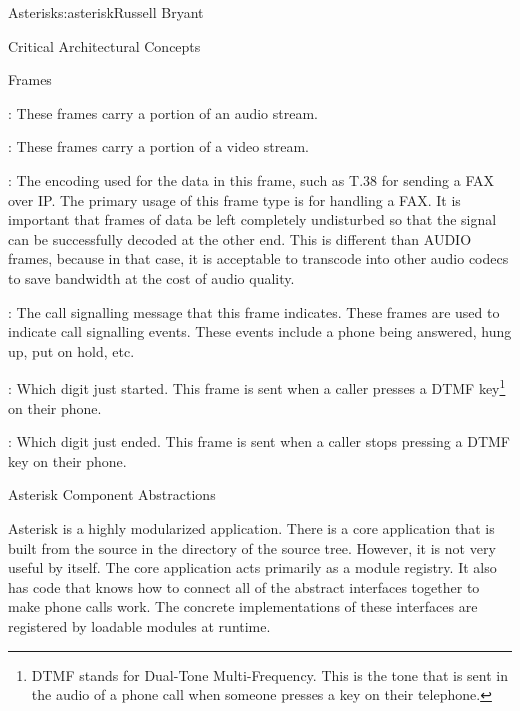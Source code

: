 \begin{aosachapter}{Asterisk}{s:asterisk}{Russell Bryant}
\begin{aosasect1}{Critical Architectural Concepts}
\begin{aosasect2}{Frames}
\begin{aosaitemize}

  \item {}: These frames carry a portion of an audio stream.

  \item {}: These frames carry a portion of a video stream.

  \item {}: The encoding used for the data in this frame,
  such as T.38 for sending a FAX over IP\@.  The primary usage of this
  frame type is for handling a FAX\@. It is important that frames of
  data be left completely undisturbed so that the signal can be
  successfully decoded at the other end. This is different than
  AUDIO frames, because in that case, it is acceptable to transcode
  into other audio codecs to save bandwidth at the cost of audio
  quality.

  \item {}: The call signalling message that this frame
  indicates.  These frames are used to indicate call signalling
  events. These events include a phone being answered, hung up, put
  on hold, etc.

  \item {}: Which digit just started.  This frame is
    sent when a caller presses a DTMF key\footnote{DTMF stands for
    Dual-Tone Multi-Frequency. This is the tone that is sent in the
    audio of a phone call when someone presses a key on their
    telephone.} on their phone.

  \item {}: Which digit just ended.  This frame is sent
  when a caller stops pressing a DTMF key on their phone.

\end{aosaitemize}

\end{aosasect2}

\end{aosasect1}

\begin{aosasect1}{Asterisk Component Abstractions}

Asterisk is a highly modularized application. There is a core
application that is built from the source in the 
directory of the source tree. However, it is not very useful by
itself.  The core application acts primarily as a module registry. It
also has code that knows how to connect all of the abstract interfaces
together to make phone calls work. The concrete implementations of
these interfaces are registered by loadable modules at runtime.


\end{aosasect1}
\end{aosachapter}
